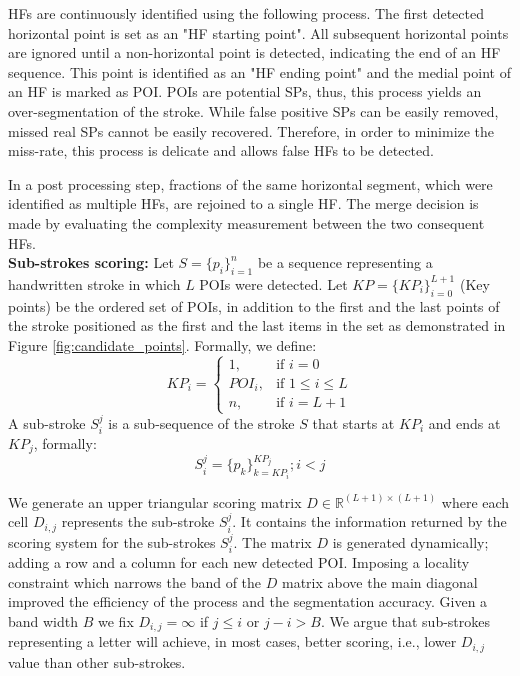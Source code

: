 \documentclass[10pt, conference, compsocconf]{IEEEtran}
\begin{document}
HFs are continuously identified using the following process.
The first detected horizontal point is set as an "HF starting point". 
All subsequent horizontal points are ignored until a non-horizontal point is detected, indicating the end of an HF sequence. 
This point is identified as an "HF ending point" and the medial point of an HF is marked as POI. 
POIs are potential SPs, thus, this process yields an over-segmentation of the stroke. 
While false positive SPs can be easily removed, missed real SPs cannot be easily recovered. 
Therefore, in order to minimize the miss-rate, this process is delicate and allows false HFs to be detected.

In a post processing step, fractions of the same horizontal segment, which were identified as multiple HFs, are rejoined to a single HF. 
The merge decision is made by evaluating the complexity measurement between the two consequent HFs.\\

\textbf{Sub-strokes scoring:}
Let $S=\{p_{i}\}_{i=1}^{n}$ be a sequence representing a handwritten stroke in which $L$ POIs were detected. 
Let $KP=\{KP_{i}\}_{i=0}^{L+1}$ (Key points) be the ordered set of POIs, in addition to the first and the last points of the stroke positioned as the first and the last items in the set as demonstrated in Figure \ref{fig:candidate_points}.
Formally, we define: 
\begin{equation}
KP_{i} =\begin{cases}    1		, & \mbox{if } i=0 \\
							   POI_{i}	, & \mbox{if } 1\leq i \leq L \\
							   n    , & \mbox{if } i=L+1 
			\end{cases}				
\end{equation}
A sub-stroke $S_{i}^{j}$ is a sub-sequence of the stroke $S$ that starts at $KP_{i}$ and ends at $KP_{j}$, formally:
\begin{equation}
S_{i}^{j}=\{p_{k}\}_{k=KP_{i}}^{KP_{j}}; i<j
\label{eq:substroke_definition}
\end{equation}

We generate an upper triangular scoring matrix $D\in\mathbb{R}^{(L+1)\times (L+1)}$ where each cell $D_{i,j}$ represents the sub-stroke $S_i^j$. It contains the information returned by the scoring system for the sub-strokes $S_i^j$. 
The matrix $D$ is generated dynamically; adding a row and a column for each new detected POI. 
Imposing a locality constraint which narrows the band of the $D$ matrix above the main diagonal improved the efficiency of the process and the segmentation accuracy. 
Given a band width $B$ we fix $D_{i,j}=\infty$ if  $j \leq i$ or $j-i>B$.
We argue that sub-strokes representing a letter will achieve, in most cases, better scoring, i.e., lower $D_{i,j}$ value than other sub-strokes.
\end{document}
